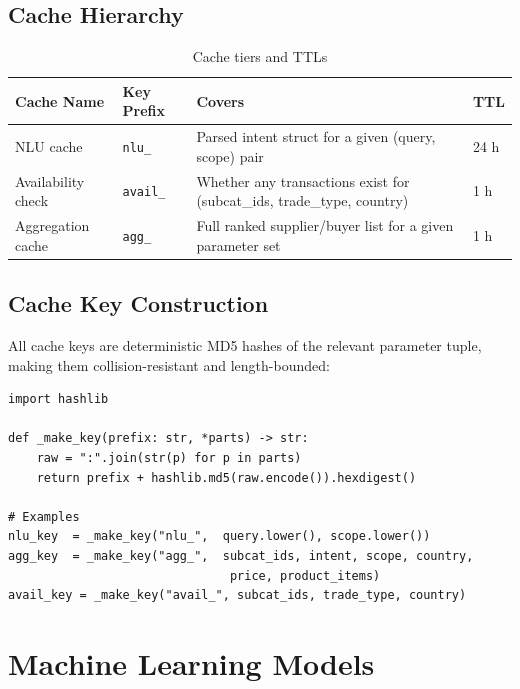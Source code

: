 \documentclass[12pt,a4paper]{article}
\begin{document}
\subsection{Cache Hierarchy}

\begin{table}[H]
\centering
\renewcommand{\arraystretch}{1.3}
\begin{tabularx}{\textwidth}{llXl}
\toprule
\rowcolor{tableheader!20}
\textbf{Cache Name} & \textbf{Key Prefix} & \textbf{Covers} & \textbf{TTL} \\
\midrule
NLU cache           & \texttt{nlu\_}  &
  Parsed intent struct for a given (query, scope) pair & 24 h \\
Availability check  & \texttt{avail\_} &
  Whether any transactions exist for (subcat\_ids, trade\_type, country) & 1 h \\
Aggregation cache   & \texttt{agg\_} &
  Full ranked supplier/buyer list for a given parameter set & 1 h \\
\bottomrule
\end{tabularx}
\caption{Cache tiers and TTLs}
\end{table}

\subsection{Cache Key Construction}

All cache keys are deterministic MD5 hashes of the relevant parameter tuple, making
them collision-resistant and length-bounded:

\begin{lstlisting}[caption={Cache key construction pattern}]
import hashlib

def _make_key(prefix: str, *parts) -> str:
    raw = ":".join(str(p) for p in parts)
    return prefix + hashlib.md5(raw.encode()).hexdigest()

# Examples
nlu_key  = _make_key("nlu_",  query.lower(), scope.lower())
agg_key  = _make_key("agg_",  subcat_ids, intent, scope, country,
                               price, product_items)
avail_key = _make_key("avail_", subcat_ids, trade_type, country)
\end{lstlisting}

\newpage
\section{Machine Learning Models}
\label{sec:ml}
\end{document}
